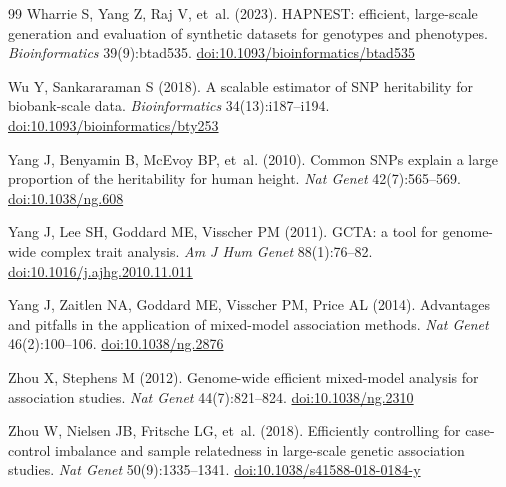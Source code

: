 \documentclass[11pt]{article}
\begin{document}
\begin{thebibliography}{99}
Wharrie S, Yang Z, Raj V, et~al. (2023). HAPNEST: efficient, large-scale
generation and evaluation of synthetic datasets for genotypes and
phenotypes. \emph{Bioinformatics} 39(9):btad535.
\href{https://doi.org/10.1093/bioinformatics/btad535}{doi:10.1093/bioinformatics/btad535}

Wu Y, Sankararaman S (2018). A scalable estimator of SNP heritability
for biobank-scale data. \emph{Bioinformatics} 34(13):i187--i194.
\href{https://doi.org/10.1093/bioinformatics/bty253}{doi:10.1093/bioinformatics/bty253}

Yang J, Benyamin B, McEvoy BP, et~al. (2010). Common SNPs explain a
large proportion of the heritability for human height. \emph{Nat Genet}
42(7):565--569.
\href{https://doi.org/10.1038/ng.608}{doi:10.1038/ng.608}

Yang J, Lee SH, Goddard ME, Visscher PM (2011). GCTA: a tool for
genome-wide complex trait analysis. \emph{Am J Hum Genet} 88(1):76--82.
\href{https://doi.org/10.1016/j.ajhg.2010.11.011}{doi:10.1016/j.ajhg.2010.11.011}

Yang J, Zaitlen NA, Goddard ME, Visscher PM, Price AL (2014). Advantages
and pitfalls in the application of mixed-model association methods.
\emph{Nat Genet} 46(2):100--106.
\href{https://doi.org/10.1038/ng.2876}{doi:10.1038/ng.2876}

Zhou X, Stephens M (2012). Genome-wide efficient mixed-model analysis
for association studies. \emph{Nat Genet} 44(7):821--824.
\href{https://doi.org/10.1038/ng.2310}{doi:10.1038/ng.2310}


Zhou W, Nielsen JB, Fritsche LG, et~al. (2018). Efficiently controlling
for case-control imbalance and sample relatedness in large-scale
genetic association studies. \emph{Nat Genet} 50(9):1335--1341.
\href{https://doi.org/10.1038/s41588-018-0184-y}{doi:10.1038/s41588-018-0184-y}

\end{thebibliography}
\end{document}
